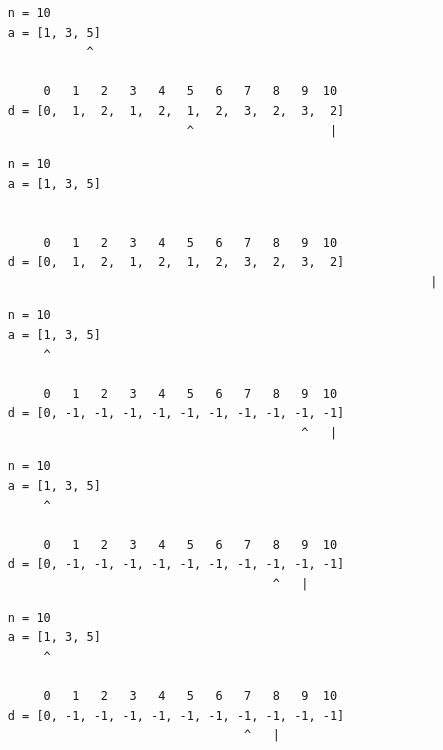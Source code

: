 \begin{frame}[fragile]
\begin{verbatim}
     n = 10
     a = [1, 3, 5]
                ^

          0   1   2   3   4   5   6   7   8   9  10
     d = [0,  1,  2,  1,  2,  1,  2,  3,  2,  3,  2]
                              ^                   |
\end{verbatim}
\end{frame}
\addtocounter{framenumber}{-1}

\begin{frame}[fragile]
\begin{verbatim}
     n = 10
     a = [1, 3, 5]


          0   1   2   3   4   5   6   7   8   9  10
     d = [0,  1,  2,  1,  2,  1,  2,  3,  2,  3,  2]
                                                                |
\end{verbatim}
\end{frame}

\begin{frame}[fragile]
\begin{verbatim}
     n = 10
     a = [1, 3, 5]
          ^

          0   1   2   3   4   5   6   7   8   9  10
     d = [0, -1, -1, -1, -1, -1, -1, -1, -1, -1, -1]
                                              ^   |
\end{verbatim}
\end{frame}
\addtocounter{framenumber}{-1}

\begin{frame}[fragile]
\begin{verbatim}
     n = 10
     a = [1, 3, 5]
          ^

          0   1   2   3   4   5   6   7   8   9  10
     d = [0, -1, -1, -1, -1, -1, -1, -1, -1, -1, -1]
                                          ^   |
\end{verbatim}
\end{frame}
\addtocounter{framenumber}{-1}

\begin{frame}[fragile]
\begin{verbatim}
     n = 10
     a = [1, 3, 5]
          ^

          0   1   2   3   4   5   6   7   8   9  10
     d = [0, -1, -1, -1, -1, -1, -1, -1, -1, -1, -1]
                                      ^   |
\end{verbatim}
\end{frame}
\addtocounter{framenumber}{-1}

